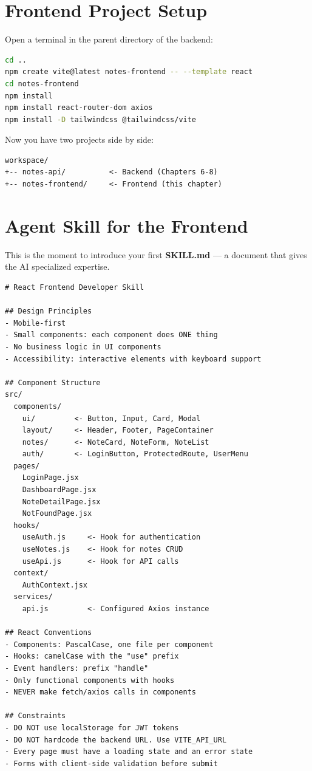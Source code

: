 \section{Frontend Project Setup}

\begin{praticabox}[title={Hands-On --- Create the React project}]
Open a terminal in the parent directory of the backend:
\begin{lstlisting}[language=bash]
cd ..
npm create vite@latest notes-frontend -- --template react
cd notes-frontend
npm install
npm install react-router-dom axios
npm install -D tailwindcss @tailwindcss/vite
\end{lstlisting}
Now you have two projects side by side:
\begin{lstlisting}[language={}]
workspace/
+-- notes-api/          <- Backend (Chapters 6-8)
+-- notes-frontend/     <- Frontend (this chapter)
\end{lstlisting}
\end{praticabox}

\section{Agent Skill for the Frontend}

This is the moment to introduce your first \textbf{SKILL.md} --- a document that gives the AI specialized expertise.

\begin{praticabox}[title={Hands-On --- Create the file \texttt{SKILL.md}}]
\end{praticabox}

\begin{lstlisting}[language={},title={\texttt{SKILL.md} --- React Frontend Developer}]
# React Frontend Developer Skill

## Design Principles
- Mobile-first
- Small components: each component does ONE thing
- No business logic in UI components
- Accessibility: interactive elements with keyboard support

## Component Structure
src/
  components/
    ui/         <- Button, Input, Card, Modal
    layout/     <- Header, Footer, PageContainer
    notes/      <- NoteCard, NoteForm, NoteList
    auth/       <- LoginButton, ProtectedRoute, UserMenu
  pages/
    LoginPage.jsx
    DashboardPage.jsx
    NoteDetailPage.jsx
    NotFoundPage.jsx
  hooks/
    useAuth.js     <- Hook for authentication
    useNotes.js    <- Hook for notes CRUD
    useApi.js      <- Hook for API calls
  context/
    AuthContext.jsx
  services/
    api.js         <- Configured Axios instance

## React Conventions
- Components: PascalCase, one file per component
- Hooks: camelCase with the "use" prefix
- Event handlers: prefix "handle"
- Only functional components with hooks
- NEVER make fetch/axios calls in components

## Constraints
- DO NOT use localStorage for JWT tokens
- DO NOT hardcode the backend URL. Use VITE_API_URL
- Every page must have a loading state and an error state
- Forms with client-side validation before submit
\end{lstlisting}

